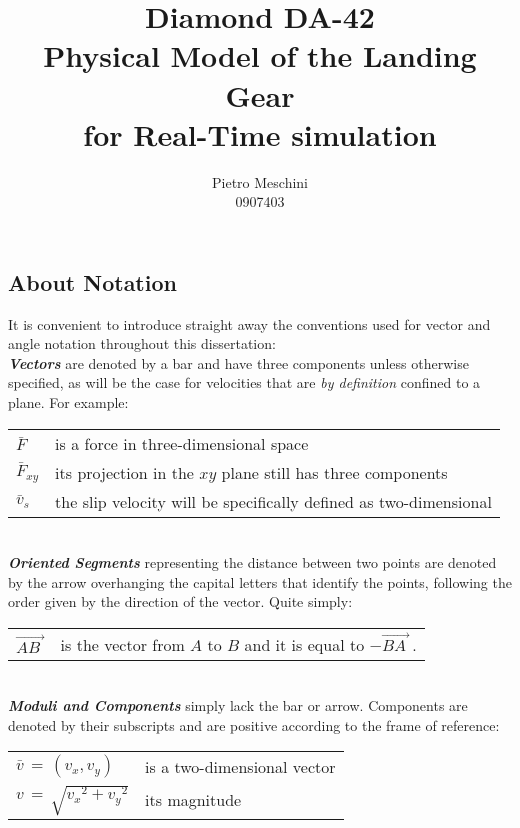 \documentclass[12pt,a4paper]{report}
\title{Diamond DA-42 \\ Physical Model of the Landing Gear \\ for Real-Time simulation}
\author{Pietro Meschini \\0907403}
\date{}
\begin{document}
\maketitle
\abstract

\tableofcontents
\pagebreak
\subsection*{About Notation} 
It is convenient to introduce straight away the conventions used for vector and angle notation throughout this dissertation:\\

\emph{\textbf{Vectors}} are denoted by a bar and have three components unless otherwise specified, as will be the case for velocities that are \emph{by definition} confined to a plane. For example:\\
\begin{tabular}{ll}
 $\bar{F}$ & is a force in three-dimensional space\\

 $\bar{F}_{xy}$ & its projection in the $xy$ plane still has three components\\
 
 $\bar{v}_s$ & the slip velocity will be specifically defined as two-dimensional\\
\end{tabular}\\

\emph{\textbf{Oriented Segments}} representing the distance between two points are denoted by the arrow overhanging the capital letters that identify the points, following the order given by the direction of the vector. Quite simply:\\
\begin{tabular}{ll}
$\overrightarrow{AB\;}$ & is the vector from $A$ to $B$ and it is equal to $-\overrightarrow{BA\:}\,$.\\
\end{tabular}\\

\emph{\textbf{Moduli and Components}} simply lack the bar or arrow. Components are denoted by their subscripts and are positive according to the frame of reference:\\
\begin{tabular}{ll}
$\bar{v}\,=\,(v_x,v_y)$ & is a two-dimensional vector\\
$v\,=\, \sqrt{{v_x}^2+{v_y}^2}$ & its magnitude
\end{tabular}\\
\\
\end{document}
